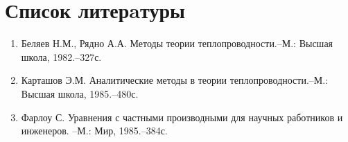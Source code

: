 \documentclass[12pt, a4paper, draft]{article}
\begin{document}
\section*{Список литерaтуры}
\begin{enumerate}
  \item Беляев Н.М., Рядно А.А. Методы теории теплопроводности.--М.: Высшая школа, 1982.--327с.
  \item Карташов Э.М. Аналитические методы в теории теплопроводности.--М.: Высшая школа, 1985.--480с.
  \item Фарлоу С. Уравнения с частными производными для научных работников и инженеров. --М.: Мир, 1985.--384с.
\end{enumerate}
\end{document}
